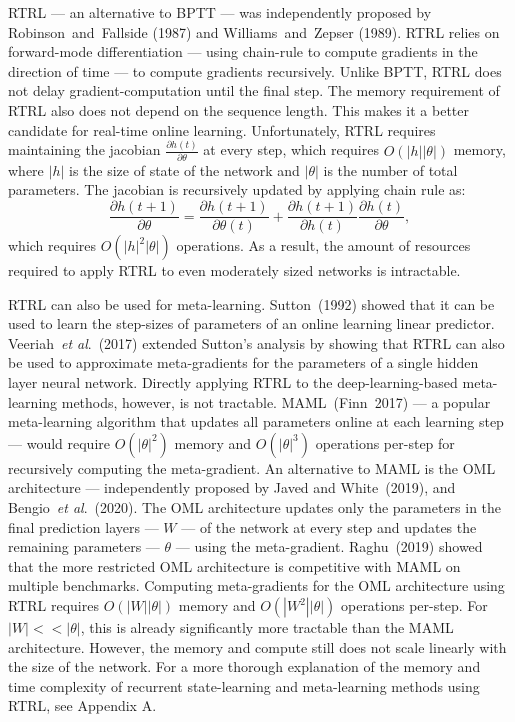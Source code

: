 \documentclass{article}
\newcommand{\etal}{\textit{et al}.}
\begin{document}
RTRL --- an alternative to BPTT --- was independently proposed by Robinson~and~Fallside (1987) and Williams~and~Zepser (1989). RTRL relies on forward-mode differentiation --- using chain-rule to compute gradients in the direction of time --- to compute gradients recursively. Unlike BPTT, RTRL does not delay gradient-computation until the final step. The memory requirement of RTRL also does not depend on the sequence length. This makes it a better candidate for real-time online learning. Unfortunately, RTRL requires maintaining the jacobian $\frac{\partial h(t)}{\partial \theta}$ at every step, which requires $O(|h||\theta|)$ memory, where $|h|$ is the size of state of the network and $|\theta|$ is the number of total parameters. The jacobian is recursively updated by applying chain rule as:  
$$\frac{\partial h(t+1)}{\partial \theta} =\frac{\partial h(t+1)}{\partial \theta(t)} +  \frac{\partial h(t+1)}{\partial h(t)}\frac{\partial h(t)}{\partial \theta}, $$ 
which requires  $O(|h|^2|\theta|)$ operations. As a result, the amount of resources required to apply RTRL to even moderately sized networks is intractable.

RTRL can also be used for meta-learning. Sutton~(1992) showed that it can be used to learn the step-sizes of parameters of an online learning linear predictor. Veeriah~\etal~(2017) extended Sutton's analysis by showing that RTRL can also be used to approximate meta-gradients for the parameters of a single hidden layer neural network. Directly applying RTRL to the deep-learning-based meta-learning methods, however, is not tractable. MAML~(Finn~2017) --- a popular meta-learning algorithm that updates all parameters online at each learning step --- would require $O(|\theta|^2)$ memory and $O(|\theta|^3)$ operations per-step for recursively computing the meta-gradient. An alternative to MAML is the OML architecture --- independently proposed by Javed and White~(2019), and Bengio~\etal~(2020). The OML architecture updates only the parameters in the final prediction layers --- $W$ --- of the network at every step and updates the remaining parameters --- $\theta$ --- using the meta-gradient. Raghu~(2019) showed that the more restricted OML architecture is competitive with MAML on multiple benchmarks. Computing meta-gradients for the OML architecture using RTRL requires $O(|W||\theta|)$ memory and $O(|W^2||\theta|)$ operations per-step. For $|W| << |\theta|$, this is already significantly more tractable than the MAML architecture. However, the memory and compute still does not scale linearly with the size of the network. For a more thorough explanation of the memory and time complexity of recurrent state-learning and meta-learning methods using RTRL, see Appendix A. 
 
\end{document}
